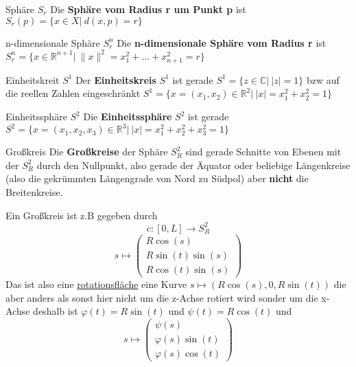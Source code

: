 \begin{titleDef}{Sphäre $S_r$}
\label{sphere}
Die \textbf{Sphäre vom Radius r um Punkt p} ist \\$S_r(p)=\{x\in X|\ d(x,p)=r\}$
\end{titleDef}

\begin{titleDef}{n-dimensionale Sphäre $S_r^n$}
	\label{ndimsphere}
	Die \textbf{n-dimensionale Sphäre vom Radius r} ist\\
	$S^n_r=\{x\in\mathbb{R}^{n+1}|\ \lVert x\rVert^2=x_1^2+\dots+x_{n+1}^2=r\}$
\end{titleDef}

\begin{titleDef}{Einheitskreit $S^1$}
\label{Einheitskreis}
Der \textbf{Einheitskreis} $S^1$ ist gerade $S^1=\{z\in\mathbb{C} |\ \lvert z\rvert = 1\}$ bzw auf die reellen Zahlen eingeschränkt ${S^1=\{x=(x_1,x_2)\in\mathbb{R}^2 |\ \lvert x\rvert =x_1^2+x_2^2=1\}}$
\end{titleDef}

\begin{titleDef}{Einheitssphäre $S^2$}
	\label{Einheitssphere}
	Die \textbf{Einheitssphäre} $S^2$ ist gerade ${S^2=\{x=(x_1,x_2,x_3)\in\mathbb{R}^3 |\ \lvert x\rvert =x_1^2+x_2^2+x_3^2=1\}}$
\end{titleDef}

\begin{titleDef}{Großkreis}
\label{grosskreis}
Die \textbf{Großkreise} der Sphäre $S_R^2$ sind gerade Schnitte von Ebenen mit der $S_R^2$ durch den Nullpunkt, also gerade der Äquator oder beliebige Längenkreise (also die gekrümmten Längengrade von Nord zu Südpol) aber \textbf{nicht} die Breitenkreise.\par
Ein Großkreis ist z.B gegeben durch
$$c:[0,L]\to S_R^2$$
$$s\mapsto\begin{pmatrix}
	R\cos(s)\\R\sin(t)\sin(s)\\R\cos(t)\sin(s)
\end{pmatrix}$$
Das ist also eine \hyperref[rotFlaeche]{rotationsfläche} eine Kurve $s\mapsto(R\cos(s),0,R\sin(t))$ die aber anders als sonst hier nicht um die z-Achse rotiert wird sonder um die x-Achse deshalb ist $\varphi(t)=R\sin(t)$ und $\psi(t)=R\cos(t)$ und
$$s\mapsto\begin{pmatrix}
	\psi(s)\\\varphi(s)\sin(t)\\\varphi(s)\cos(t)
\end{pmatrix}$$
\end{titleDef}

